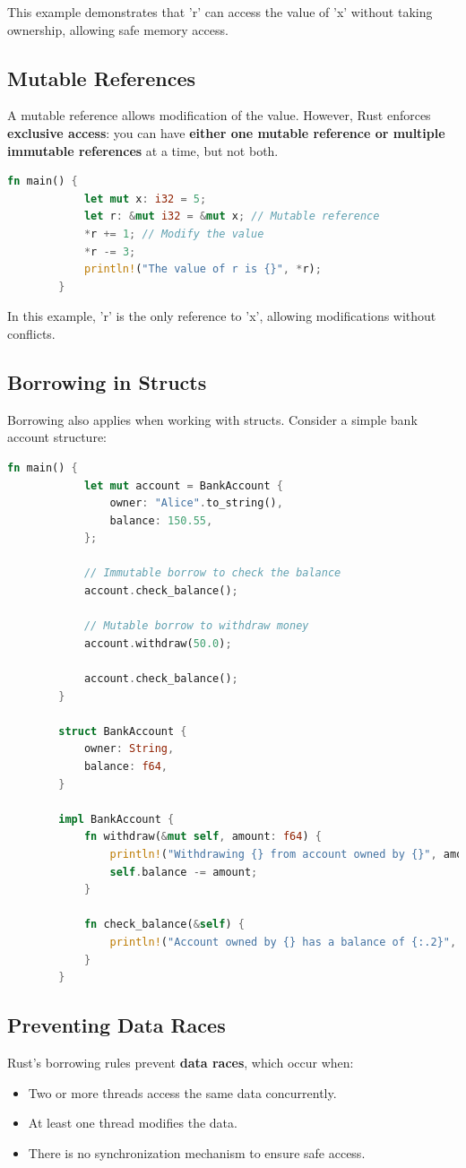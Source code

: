 \documentclass[a4paper,12pt]{report}
\begin{document}
	\noindent This example demonstrates that 'r' can access the value of 'x' without taking ownership, allowing safe memory access.
	
	\subsection*{Mutable References}
	A mutable reference allows modification of the value. However, Rust enforces \textbf{exclusive access}: you can have \textbf{either one mutable reference or multiple immutable references} at a time, but not both.
	
	\begin{lstlisting}[language=Rust]
		fn main() {
			let mut x: i32 = 5;
			let r: &mut i32 = &mut x; // Mutable reference
			*r += 1; // Modify the value
			*r -= 3;
			println!("The value of r is {}", *r);
		}
	\end{lstlisting}
	
		\noindent In this example, 'r' is the only reference to 'x', allowing modifications without conflicts.
	
	\subsection*{Borrowing in Structs}
	Borrowing also applies when working with structs. Consider a simple bank account structure:
	
	\begin{lstlisting}[language=Rust]
		fn main() {
			let mut account = BankAccount {
				owner: "Alice".to_string(),
				balance: 150.55,
			};
			
			// Immutable borrow to check the balance
			account.check_balance();
			
			// Mutable borrow to withdraw money
			account.withdraw(50.0);
			
			account.check_balance();
		}
		
		struct BankAccount {
			owner: String,
			balance: f64,
		}
		
		impl BankAccount {
			fn withdraw(&mut self, amount: f64) {
				println!("Withdrawing {} from account owned by {}", amount, self.owner);
				self.balance -= amount;
			}
			
			fn check_balance(&self) {
				println!("Account owned by {} has a balance of {:.2}", self.owner, self.balance);
			}
		}
	\end{lstlisting}
	
	\subsection*{Preventing Data Races} 
	Rust’s borrowing rules prevent \textbf{data races}, which occur when:
	\begin{itemize}
		\item Two or more threads access the same data concurrently.
		\item At least one thread modifies the data.
		\item There is no synchronization mechanism to ensure safe access.
	\end{itemize}
	
\end{document}
